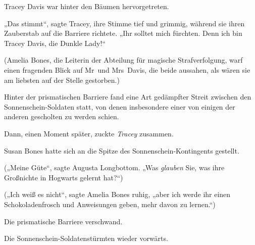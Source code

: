 Tracey Davis war hinter den Bäumen hervorgetreten.

„Das stimmt“, sagte Tracey, ihre Stimme tief und grimmig, während sie ihren Zauberstab auf die Barriere richtete.
„Ihr solltet mich fürchten. Denn ich bin Tracey Davis, die Dunkle Lady!“

(Amelia Bones, die Leiterin der Abteilung für magische Strafverfolgung, warf einen fragenden Blick auf Mr~und Mrs~Davis, die beide aussahen, als wären sie am liebsten auf der Stelle gestorben.)

Hinter der prismatischen Barriere fand eine Art gedämpfter Streit zwischen den Sonnenschein-Soldaten statt, von denen insbesondere einer von einigen der anderen gescholten zu werden schien.

Dann, einen Moment später, zuckte \emph{Tracey} zusammen.

Susan Bones hatte sich an die Spitze des Sonnenschein-Kontingents gestellt.

(„Meine Güte“, sagte Augusta Longbottom.
„Was \emph{glauben} Sie, was ihre Großnichte in Hogwarts gelernt hat?“)

(„Ich weiß es nicht“, sagte Amelia Bones ruhig, „aber ich werde ihr einen Schokoladenfrosch und Anweisungen geben, mehr davon zu lernen.“)

Die prismatische Barriere verschwand.

Die Sonnenschein-Soldatenstürmten wieder vorwärts.

